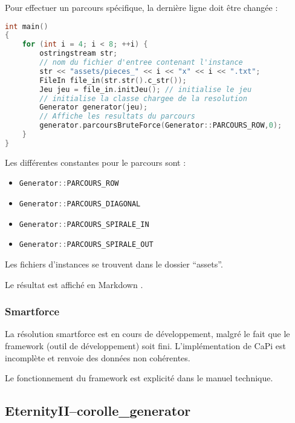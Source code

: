 	Pour effectuer un parcours spécifique, la dernière ligne doit être changée :
	
	\begin{lstlisting}[language=c++, caption={Parcours bruteforce sur plusieurs tailles du plateau, en affichant tous les résultats du rowscan}]
int main()
{
    for (int i = 4; i < 8; ++i) {
        ostringstream str;
        // nom du fichier d'entree contenant l'instance
        str << "assets/pieces_" << i << "x" << i << ".txt"; 
        FileIn file_in(str.str().c_str());
        Jeu jeu = file_in.initJeu(); // initialise le jeu
        // initialise la classe chargee de la resolution
        Generator generator(jeu); 
        // Affiche les resultats du parcours
        generator.parcoursBruteForce(Generator::PARCOURS_ROW,0); 
    }
}
	\end{lstlisting}
    
	Les différentes constantes pour le parcours sont :
    
	\begin{itemize}
		\item \lstinline[language=c++]|Generator::PARCOURS_ROW|
		\item \lstinline[language=c++]|Generator::PARCOURS_DIAGONAL|
		\item \lstinline[language=c++]|Generator::PARCOURS_SPIRALE_IN|
		\item \lstinline[language=c++]|Generator::PARCOURS_SPIRALE_OUT|
	\end{itemize}
	
	Les fichiers d'instances se trouvent dans le dossier \enquote{assets}.
	
	Le résultat est affiché en Markdown \autocite{markdown}.
	
	\subsubsection{Smartforce}
	
	La résolution smartforce est en cours de développement, malgré le fait que le framework (outil de développement) soit fini. L'implémentation de CaPi est incomplète et renvoie des données non cohérentes.
	
	Le fonctionnement du framework est explicité dans le manuel technique.
	
	\subsection{EternityII--corolle\_generator} 
	
